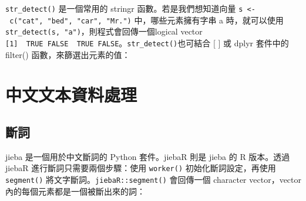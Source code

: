 \texttt{str\_detect()} 是一個常用的 stringr 函數。若是我們想知道向量
\texttt{s\ \textless{}-\ c("cat",\ "bed",\ "car",\ "Mr.")}
中，哪些元素擁有字串 a 時，就可以使用
\texttt{str\_detect(s,\ "a")}，則程式會回傳一個logical vector
\texttt{{[}1{]}\ \ TRUE\ FALSE\ \ TRUE\ FALSE}。\texttt{str\_detect()}也可結合
{[} {]} 或 dplyr 套件中的 filter() 函數，來篩選出元素的值：

\begin{Shaded}
\begin{Highlighting}[]
\OtherTok{\textless{}{-}} \NormalTok{(}\NormalTok{, }\NormalTok{, }\NormalTok{, }\NormalTok{)}
\NormalTok{s[}\NormalTok{)]}

\end{Highlighting}
\end{Shaded}

\hypertarget{ux4e2dux6587ux6587ux672cux8cc7ux6599ux8655ux7406}{%
\section{中文文本資料處理}\label{ux4e2dux6587ux6587ux672cux8cc7ux6599ux8655ux7406}}

\hypertarget{ux65b7ux8a5e}{%
\subsection{斷詞}\label{ux65b7ux8a5e}}

jieba 是一個用於中文斷詞的 Python 套件。jiebaR 則是 jieba 的 R
版本。透過 jiebaR 進行斷詞只需要兩個步驟：使用 \texttt{worker()}
初始化斷詞設定，再使用 \texttt{segment()}
將文字斷詞。\texttt{jiebaR::segment()} 會回傳一個 character
vector，vector 內的每個元素都是一個被斷出來的詞：

\begin{Shaded}
\begin{Highlighting}[]
\OtherTok{\textless{}{-}} \NormalTok{()}
\OtherTok{\textless{}{-}}  

\end{Highlighting}
\end{Shaded}

